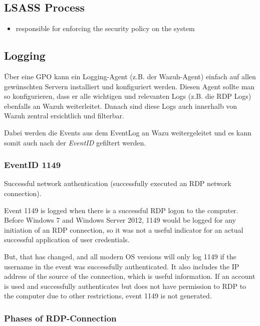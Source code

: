 \subsection{LSASS Process}
\begin{itemize}
    \item responsible for enforcing the security policy on the system
\end{itemize}

\subsection{Logging}
Über eine GPO kann ein Logging-Agent (z.B. der Wazuh-Agent) einfach auf allen gewünschten Servern installiert und konfiguriert werden.
Diesen Agent sollte man so konfigurieren, dass er alle wichtigen und relevanten Logs (z.B. die RDP Logs) ebenfalls an Wazuh weiterleitet.
Danach sind diese Logs auch innerhalb von Wazuh zentral ersichtlich und filterbar.

Dabei werden die Events aus dem EventLog an Wazu weitergeleitet und es kann somit auch nach der \textit{EventID} gefiltert werden.

\subsubsection{EventID 1149}
Successful network authentication (successfully executed an RDP network connection).

Event 1149 is logged when there is a successful RDP logon to the computer. Before Windows 7 and Windows Server 2012, 1149 would be logged for any initiation of an RDP connection, so it was not a useful indicator for an actual successful application of user credentials.

But, that has changed, and all modern OS versions will only log 1149 if the username in the event was successfully authenticated. It also includes the IP address of the source of the connection, which is useful information. If an account is used and successfully authenticates but does not have
permission to RDP to the computer due to other restrictions, event 1149 is not generated.


\subsubsection{Phases of RDP-Connection}

